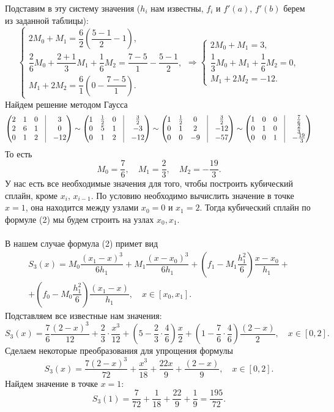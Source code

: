 \documentclass[a4paper, 12pt]{article}
\begin{document}
	Подставим в эту систему значения ($h_i$ нам известны, $f_i$ и $f'(a)$, $f'(b)$ берем из заданной таблицы):
	$$\begin{cases}
		2M_0 + M_1 =  \dfrac{6}{2}\left(\dfrac{5-1}{2} - 1\right),\\
		\dfrac{2}{6}M_{0} + \dfrac{2 +1}{3}M_1 + \dfrac{1}{6}M_{2} = \dfrac{7 -5}{1} - \dfrac{5 - 1}{2},\\
		M_{1} + 2M_2 = \dfrac{6}{1}\left(0 - \dfrac{7-5}{1} \right).
	\end{cases}
	\Rightarrow 
	\begin{cases}
	2M_0 + M_1 =  3,\\
	\dfrac{1}{3}M_{0} + M_1 + \dfrac{1}{6}M_{2} = 0,\\
	M_{1} + 2M_2 = -12.
	\end{cases}$$
	Найдем решение методом Гаусса 
	$$\begin{pmatrix}
		2&1&0&\vline&3\\
		2&6&1&\vline&0\\
		0&1&2&\vline&-12
	\end{pmatrix}
	\sim 
	\begin{pmatrix}
	1&\frac12&0&\vline&\frac32\\
	0&5&1&\vline&-3\\
	0&1&2&\vline&-12
	\end{pmatrix}
	\sim
	\begin{pmatrix}
		1&\frac12&0&\vline&\frac32\\
		0&1&2&\vline&-12\\
		0&0&-9&\vline&-57
	\end{pmatrix}
	\sim
	\begin{pmatrix}
		1&0&0&\vline&\frac76\\
		0&1&0&\vline&\frac{2}{3}\\
		0&0&1&\vline&-\frac{19}{3}
	\end{pmatrix}$$
	То есть $$M_0 = \dfrac76,\quad M_1 = \dfrac23,\quad M_2 = -\dfrac{19}{3}.$$
	У нас есть все необходимые значения для того, чтобы построить кубический сплайн, кроме $x_i$, $x_{i-1}$. По условию необходимо вычислить значение в точке $x=1$, она находится между узлами $x_0 = 0$ и $x_1 = 2$. Тогда кубический сплайн по формуле (2) мы будем строить на узлах $x_0, x_1$.\\\\
	В нашем случае формула (2) примет вид \begin{multline*}
		S_3(x) = M_0\dfrac{(x_1 - x)^3}{6h_1} + M_{1}\dfrac{(x-x_0)^3}{6h_1} + \left(f_1 - M_1\dfrac{h_1^2}{6}\right)\dfrac{x-x_0}{h_1} +\\+ \left(f_0 - M_0\dfrac{h_1^2}{6}\right)\dfrac{(x_1 - x)}{h_1},\quad x\in [x_0, x_1].
	\end{multline*}
	Подставляем все известные нам значения:
	$$
		S_3(x) = \dfrac76\dfrac{(2 - x)^3}{12} + \dfrac23\cdot\dfrac{x^3}{12} + \left(5 - \dfrac23\cdot\dfrac{4}{6}\right)\dfrac{x}{2} + \left(1 - \dfrac76\cdot\dfrac{4}{6}\right)\dfrac{(2 - x)}{2},\quad x\in [0, 2].
	$$
	Сделаем некоторые преобразования для упрощения формулы
	$$
	S_3(x) = \dfrac{7(2 - x)^3}{72} + \dfrac{x^3}{18} + \dfrac{22x}{9} + \dfrac{(2 - x)}{9},\quad x\in [0, 2].
	$$
	Найдем значение в точке $x=1$:
	$$
	S_3(1) = \dfrac{7}{72} + \dfrac{1}{18} + \dfrac{22}{9} + \dfrac{1}{9} = \dfrac{195}{72}.
	$$
\end{document}
